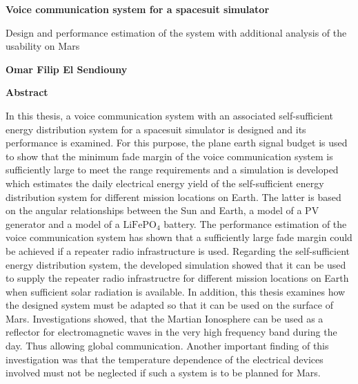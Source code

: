 \thispagestyle{plain}
\begin{center}
	\Large
	\textbf{Voice communication system for a spacesuit simulator}
	
	\vspace{0.4cm}
	\large
	Design and performance estimation of the system with additional analysis of the usability on Mars 
	
	\vspace{0.4cm}
	\textbf{Omar Filip El Sendiouny}
	
	\vspace{0.9cm}
	\textbf{Abstract}
\end{center}

In this thesis, a voice communication system with an associated self-sufficient energy distribution system for a spacesuit simulator is designed and its performance is examined. For this purpose, the plane earth signal budget is used to show that the minimum fade margin of the voice communication system is sufficiently large to meet the range requirements and a \MATLAB simulation is developed which estimates the daily electrical energy yield of the self-sufficient energy distribution system for different mission locations on Earth. The latter is based on the angular relationships between the Sun and Earth, a model of a PV generator and a model of a $\mathrm{LiFePO_4}$ battery. The performance estimation of the voice communication system has shown that a sufficiently large fade margin could be achieved if a repeater radio infrastructure is used. Regarding the self-sufficient energy distribution system, the developed \MATLAB simulation showed that it can be used to supply the repeater radio infrastructre for different mission locations on Earth when sufficient solar radiation is available. In addition, this thesis examines how the designed system must be adapted so that it can be used on the surface of Mars. Investigations showed, that the Martian Ionosphere can be used as a reflector for electromagnetic waves in the very high frequency band during the day. Thus allowing global communication. Another important finding of this investigation was that the temperature dependence of the electrical devices involved must not be neglected if such a system is to be planned for Mars. 